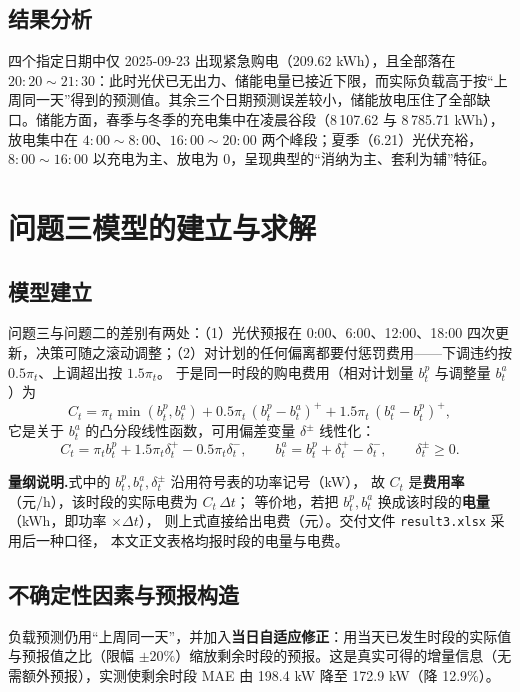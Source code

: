 \documentclass{cumcmthesis}
\begin{document}
\subsection{结果分析}
四个指定日期中仅 2025-09-23 出现紧急购电（209.62 kWh），且全部落在 $20{:}20\sim21{:}30$：此时光伏已无出力、储能电量已接近下限，而实际负载高于按“上周同一天”得到的预测值。其余三个日期预测误差较小，储能放电压住了全部缺口。储能方面，春季与冬季的充电集中在凌晨谷段（8\,107.62 与 8\,785.71 kWh），放电集中在 $4{:}00\sim8{:}00$、$16{:}00\sim20{:}00$ 两个峰段；夏季（6.21）光伏充裕，$8{:}00\sim16{:}00$ 以充电为主、放电为 0，呈现典型的“消纳为主、套利为辅”特征。

\section{问题三模型的建立与求解}
\subsection{模型建立}
问题三与问题二的差别有两处：（1）光伏预报在 0:00、6:00、12:00、18:00 四次更新，决策可随之滚动调整；（2）对计划的任何偏离都要付惩罚费用——下调违约按 $0.5\pi_t$、上调超出按 $1.5\pi_t$。
于是同一时段的购电费用（相对计划量 $b^p_t$ 与调整量 $b^a_t$）为
\begin{equation}
    C_t=\pi_t\min(b^p_t,b^a_t)+0.5\pi_t\,(b^p_t-b^a_t)^{+}+1.5\pi_t\,(b^a_t-b^p_t)^{+},
    \label{eq:q3_cost}
\end{equation}
它是关于 $b^a_t$ 的凸分段线性函数，可用偏差变量 $\delta^{\pm}$ 线性化：
\begin{equation}
    C_t=\pi_t b^p_t+1.5\pi_t\delta^{+}_t-0.5\pi_t\delta^{-}_t,\qquad
    b^a_t=b^p_t+\delta^{+}_t-\delta^{-}_t,\qquad \delta^{\pm}_t\ge0 .
\end{equation}

\noindent\textbf{量纲说明.}式中的 $b^p_t,b^a_t,\delta^{\pm}_t$ 沿用符号表的功率记号（kW），
故 $C_t$ 是\textbf{费用率}（元/h），该时段的实际电费为 $C_t\,\Delta t$；
等价地，若把 $b^p_t,b^a_t$ 换成该时段的\textbf{电量}（kWh，即功率 $\times\Delta t$），
则上式直接给出电费（元）。交付文件 \texttt{result3.xlsx} 采用后一种口径，
本文正文表格均报时段的电量与电费。

\subsection{不确定性因素与预报构造}
负载预测仍用“上周同一天”，并加入\textbf{当日自适应修正}：用当天已发生时段的实际值与预报值之比（限幅 $\pm20\%$）缩放剩余时段的预报。这是真实可得的增量信息（无需额外预报），实测使剩余时段 MAE 由 198.4 kW 降至 172.9 kW（降 12.9\%）。
\end{document}
